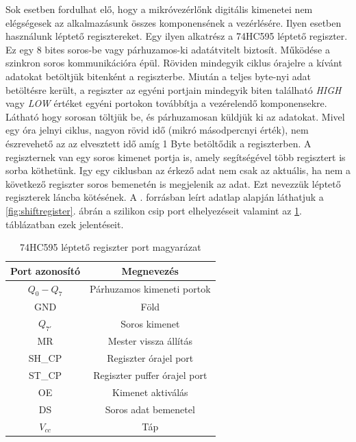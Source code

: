 \documentclass[a4paper,12pt]{article}
\begin{document}
Sok esetben fordulhat elő, hogy a mikróvezérlőnk digitális kimenetei nem elégségesek az alkalmazásunk összes komponensének a vezérlésére.
Ilyen esetben használunk léptető regisztereket. Egy ilyen alkatrész a 74HC595 léptető regiszter.
Ez egy 8 bites soros-be vagy párhuzamos-ki adatátvitelt biztosít.
Működése a szinkron soros kommunikációra épül.
Röviden mindegyik ciklus órajelre a kívánt adatokat betöltjük bitenként a regiszterbe. 
Miután a teljes byte-nyi adat betöltésre került, a regiszter az egyéni portjain mindegyik biten található \textit{HIGH} vagy \textit{LOW} értéket egyéni portokon továbbítja a vezérelendő komponensekre.
Látható hogy sorosan töltjük be, és párhuzamosan küldjük ki az adatokat. 
Mivel egy óra jelnyi ciklus, nagyon rövid idő (mikró másodpercnyi érték), nem észrevehető az az elvesztett idő amíg 1 Byte betöltődik a regiszterben.
A regiszternek van egy soros kimenet portja is, amely segítségével több regisztert is sorba köthetünk.
Igy egy ciklusban az érkező adat nem csak az aktuális, ha nem a következő regiszter soros bemenetén is megjelenik az adat. Ezt nevezzük léptető regiszterek láncba kötésének.
A \cite{tein19}. forrásban leírt adatlap alapján láthatjuk a \ref{fig:shiftregister}. ábrán a  szilikon csip port elhelyezéseit valamint az \ref{tab:shiftregister}. táblázatban ezek jelentéseit.

\begin{table}[!htbp]
    \centering
    \begin{tabular}{|c|c|} \hline
        Port azonosító & Megnevezés \\ \hline
        $Q_{0} - Q_{7}$ & Párhuzamos kimeneti portok \\ \hline
        GND & Föld  \\ \hline
        $Q_{7'}$ & Soros kimenet \\ \hline
        MR & Mester vissza állítás \\ \hline
        SH\_CP & Regiszter órajel port \\ \hline
        ST\_CP & Regiszter puffer órajel port \\ \hline
        OE & Kimenet aktiválás \\ \hline
        DS & Soros adat bemenetel \\ \hline
        $V_{cc}$ & Táp \\ \hline
    \end{tabular}
    \caption[74HC595 port leírás]{74HC595 léptető regiszter port magyarázat}
    \label{tab:shiftregister}
\end{table}
\end{document}
